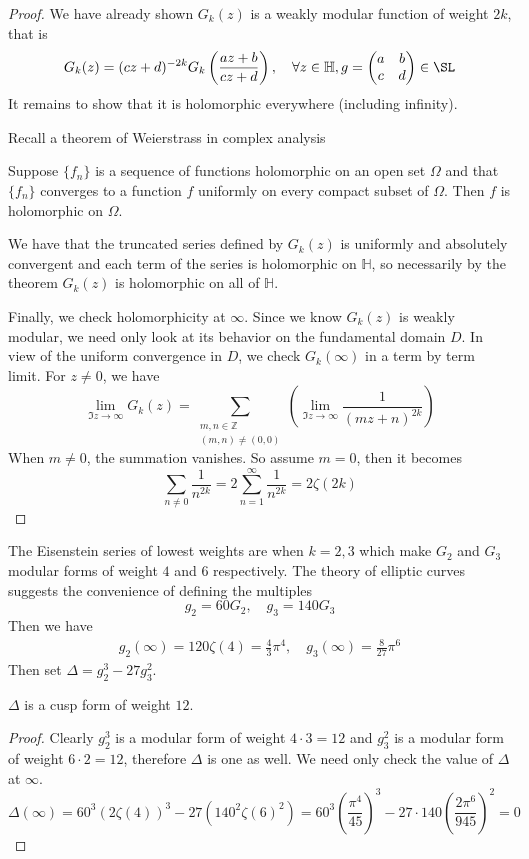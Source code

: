\documentclass[12pt]{article}
\theoremstyle{definition}
\begin{document}
\begin{proof}
We have already shown \(G_k(z)\) is a weakly modular function of weight \(2k\), that is
\[
    G_k(z) = (cz+d)^{-2k}G_k\left(\frac{az+b}{cz+d}\right), \quad \forall z\in \mathbb{H}, g = \begin{pmatrix}
        a &  b \\
        c &  d \\
    \end{pmatrix} \in \SL
\] 
It remains to show that it is holomorphic everywhere (including infinity).

Recall a theorem of Weierstrass in complex analysis
\begin{thm}
Suppose \(\{ f_n \} \) is a sequence of functions holomorphic on an open set \(\Omega \) and that \(\{ f_n \} \) converges to a function \(f\) uniformly on every compact subset of \(\Omega \). Then \(f\) is holomorphic on \(\Omega \).      
\end{thm}
We have that the truncated series defined by \(G_k(z)\) is uniformly and absolutely convergent and each term of the series is holomorphic on \(\mathbb{H} \), so necessarily by the theorem \(G_k(z)\) is holomorphic on all of \(\mathbb{H} \).

Finally, we check holomorphicity at \(\infty \). Since we know \(G_k(z)\) is weakly modular, we need only look at its behavior on the fundamental domain \(D\). In view of the uniform convergence in \(D\), we check \(G_k(\infty )\) in a term by term limit. For \(z\ne 0\), we have  
\[
    \lim_{\Im z \to \infty }G_k(z) = \sum_{\substack{m,n\in \mathbb{Z}\\(m,n)\ne (0,0)}} \left(\lim_{\Im z \to \infty } \frac{1}{(mz+n)^{2k} }\right) 
\]    
When \(m \ne 0\), the summation vanishes. So assume \(m = 0\), then it becomes
\[
    \sum_{n\ne 0} \frac{1}{n^{2k} } = 2 \sum_{n=1}^{\infty} \frac{1}{n^{2k} } = 2 \zeta (2k)  
\] 
\end{proof}

The Eisenstein series of lowest weights are when \(k=2,3\) which make \(G_2\) and \(G_3\) modular forms of weight \(4\) and \(6\) respectively. The theory of elliptic curves suggests the convenience of defining the multiples
\[
    g_2=60G_2, \quad g_3 =140G_3
\]
Then we have
\begin{align*}
g_2(\infty ) = 120\zeta(4) = \frac{4}{3}\pi ^4, \quad g_3(\infty ) = \frac{8}{27}\pi ^6
\end{align*} 
Then set \(\Delta =g_2^3 - 27g_3^2\).
\begin{claim}
    \(\Delta \) is a cusp form of weight \(12\).  
\end{claim}
\begin{proof}
Clearly \(g_2^3\) is a modular form of weight \(4\cdot 3=12\) and \(g_3^2\) is a modular form of weight \(6\cdot 2=12\), therefore \(\Delta \) is one as well. We need only check the value of \(\Delta \) at \(\infty \).
\[
    \Delta (\infty ) = 60^3 (2\zeta (4))^3 - 27 (140^2 \zeta (6)^2) = 60^3 \left( \frac{\pi ^4}{45} \right)^3 - 27 \cdot 140 \left( \frac{2\pi ^6}{945} \right)^2 = 0
    \]       
\end{proof}
\end{document}
